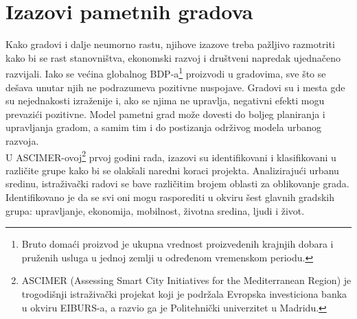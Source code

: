 \documentclass[a4paper,12pt]{article}
\begin{document}
{\section{Izazovi pametnih gradova}	
\label{sec:termini_i_citiranje}


 Kako gradovi i dalje neumorno rastu, njihove izazove treba pažljivo razmotriti kako bi se rast stanovništva, ekonomski razvoj i društveni napredak ujednačeno razvijali. Iako se većina globalnog BDP-a\footnote{Bruto domaći proizvod je ukupna vrednost proizvedenih krajnjih dobara i pruženih usluga u jednoj zemlji u određenom vremenskom periodu. } proizvodi u gradovima, sve što se dešava unutar njih ne podrazumeva pozitivne nuspojave. Gradovi su i mesta gde su nejednakosti izraženije i, ako se njima ne upravlja, negativni efekti mogu prevazići pozitivne. Model pametni grad može dovesti do boljeg planiranja i upravljanja gradom, a samim tim i do postizanja održivog modela urbanog razvoja. \\

U ASCIMER-ovoj\footnote{ASCIMER (Assessing Smart City Initiatives for the Mediterranean Region) je trogodišnji istraživački projekat koji je podržala Evropska investiciona banka u okviru EIBURS-a, a razvio ga je Politehnički univerzitet u Madridu.} prvoj godini rada, izazovi su identifikovani i klasifikovani u različite grupe kako bi se olakšali naredni koraci projekta. Analizirajući urbanu sredinu, istraživački radovi se bave različitim brojem oblasti za oblikovanje grada. Identifikovano je da se svi oni mogu rasporediti u okviru šest glavnih gradskih grupa: upravljanje, ekonomija, mobilnost, životna sredina, ljudi i život. \\


}
\end{document}
